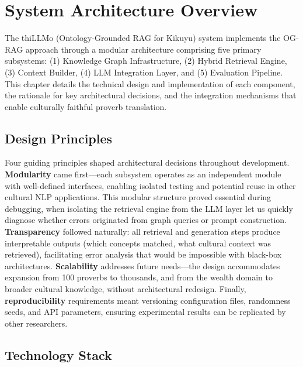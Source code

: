\label{chap:design}

\section{System Architecture Overview}
\label{sec:system_architecture}

The thiLLMo (Ontology-Grounded RAG for Kikuyu) system implements the OG-RAG approach through a modular architecture comprising five primary subsystems: (1) Knowledge Graph Infrastructure, (2) Hybrid Retrieval Engine, (3) Context Builder, (4) LLM Integration Layer, and (5) Evaluation Pipeline. This chapter details the technical design and implementation of each component, the rationale for key architectural decisions, and the integration mechanisms that enable culturally faithful proverb translation.

\subsection{Design Principles}
\label{subsec:design_principles}

Four guiding principles shaped architectural decisions throughout development. \textbf{Modularity} came first—each subsystem operates as an independent module with well-defined interfaces, enabling isolated testing and potential reuse in other cultural NLP applications. This modular structure proved essential during debugging, when isolating the retrieval engine from the LLM layer let us quickly diagnose whether errors originated from graph queries or prompt construction. \textbf{Transparency} followed naturally: all retrieval and generation steps produce interpretable outputs (which concepts matched, what cultural context was retrieved), facilitating error analysis that would be impossible with black-box architectures. \textbf{Scalability} addresses future needs—the design accommodates expansion from 100 proverbs to thousands, and from the wealth domain to broader cultural knowledge, without architectural redesign. Finally, \textbf{reproducibility} requirements meant versioning configuration files, randomness seeds, and API parameters, ensuring experimental results can be replicated by other researchers.

\subsection{Technology Stack}
\label{subsec:tech_stack}

